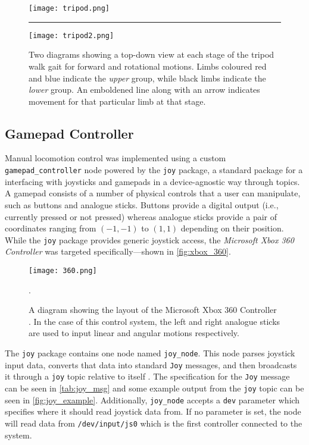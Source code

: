 \begin{figure}[!h]
    \centering
    \texttt{[image: tripod.png]}
    \vspace{1em}
    \hrule
    \vspace{1em}
    \texttt{[image: tripod2.png]}
    \caption{Two diagrams showing a top-down view at each stage of the tripod walk gait for forward and rotational motions. Limbs coloured red and blue indicate the \emph{upper} group, while black limbs indicate the \emph{lower} group. An emboldened line along with an arrow indicates movement for that particular limb at that stage.}
    \label{fig:tripod_gait_forward}
\end{figure}


\subsection{Gamepad Controller}

Manual locomotion control was implemented using a custom \texttt{gamepad\_controller} node powered by the \texttt{joy} package, a standard package for a interfacing with joysticks and gamepads in a device-agnostic way through topics. A gamepad consists of a number of physical controls that a user can manipulate, such as buttons and analogue sticks. Buttons provide a digital output (i.e., currently pressed or not pressed) whereas analogue sticks provide a pair of coordinates ranging from $(-1, -1)$ to $(1, 1)$ depending on their position. While the \texttt{joy} package provides generic joystick access, the \emph{Microsoft Xbox 360 Controller} was targeted specifically---shown in \autoref{fig:xbox_360}.

\begin{figure}[!h]
	\centering
	\texttt{[image: 360.png]}
	\caption{A diagram showing the layout of the Microsoft Xbox 360 Controller \cite{360_controller}. In the case of this control system, the left and right analogue sticks are used to input linear and angular motions respectively.}.
	\label{fig:xbox_360}
\end{figure}

The \texttt{joy} package contains one node named \texttt{joy\_node}. This node parses joystick input data, converts that data into standard \texttt{Joy} messages, and then broadcasts it through a \texttt{joy} topic relative to itself \cite{ros_wiki_joy}. The specification for the \texttt{Joy} message can be seen in \autoref{tab:joy_msg} and some example output from the \texttt{joy} topic can be seen in \autoref{fig:joy_example}. Additionally, \texttt{joy\_node} accepts a \texttt{dev} parameter which specifies where it should read joystick data from. If no parameter is set, the node will read data from \texttt{/dev/input/js0} which is the first controller connected to the system. 

